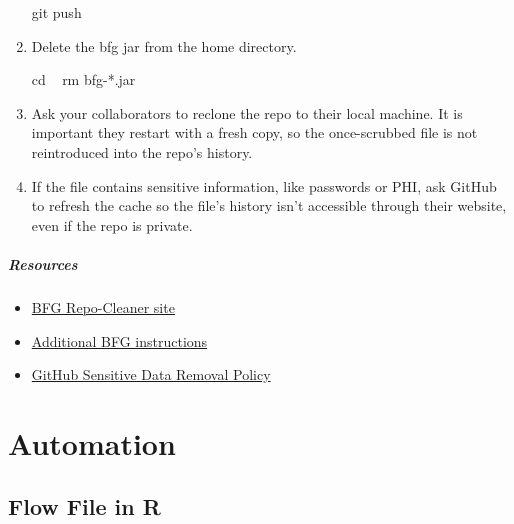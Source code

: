 \documentclass[]{book}
\newenvironment{Shaded}{\begin{snugshade}}{\end{snugshade}}
\newcommand{\BuiltInTok}[1]{#1}
\newcommand{\FunctionTok}[1]{\textcolor[rgb]{0.00,0.00,0.00}{#1}}
\newcommand{\NormalTok}[1]{#1}
\providecommand{\tightlist}{%
  \setlength{\itemsep}{0pt}\setlength{\parskip}{0pt}}
\let\oldparagraph\paragraph
\renewcommand{\paragraph}[1]{\oldparagraph{#1}\mbox{}}
\begin{document}
\begin{enumerate}
\begin{Shaded}
\begin{Highlighting}[]
\FunctionTok{git}\NormalTok{ push}
\end{Highlighting}
\end{Shaded}
\item
  Delete the bfg jar from the home directory.

\begin{Shaded}
\begin{Highlighting}[]
\BuiltInTok{cd}\NormalTok{ ~}
\FunctionTok{rm}\NormalTok{ bfg-*.jar}
\end{Highlighting}
\end{Shaded}
\item
  Ask your collaborators to reclone the repo to their local machine. It is important they restart with a fresh copy, so the once-scrubbed file is not reintroduced into the repo's history.
\item
  If the file contains sensitive information, like passwords or PHI, ask GitHub to refresh the cache so the file's history isn't accessible through their website, even if the repo is private.
\end{enumerate}

\hypertarget{resources}{%
\paragraph{Resources}\label{resources}}

\begin{itemize}
\tightlist
\item
  \href{https://rtyley.github.io/bfg-repo-cleaner/}{BFG Repo-Cleaner site}
\item
  \href{https://github.com/IBM/BluePic/wiki/Using-BFG-Repo-Cleaner-tool-to-remove-sensitive-files-from-your-git-repo}{Additional BFG instructions}
\item
  \href{https://help.github.com/articles/github-sensitive-data-removal-policy/}{GitHub Sensitive Data Removal Policy}
\end{itemize}

\hypertarget{automation}{%
\chapter{Automation}\label{automation}}

\hypertarget{flow-file-in-r}{%
\section{Flow File in R}\label{flow-file-in-r}}
\end{document}
